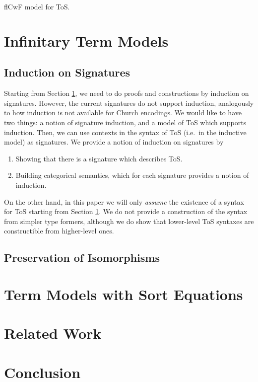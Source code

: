 \documentclass{llncs}
\newcommand{\ToS}{\mathsf{ToS}}
\newcommand{\flCwF}{\mathsf{flCwF}}
\begin{document}
\begin{nidefinition}{flCwF model for ToS.}
\begin{itemize}
\end{itemize}






\end{nidefinition}





\section{Infinitary Term Models}
\label{sec:infinitary_term_models}

\subsection{Induction on Signatures}


Starting from Section \ref{sec:infinitary_term_models}, we need to do proofs and
constructions by induction on signatures. However, the current signatures do not
support induction, analogously to how induction is not available for Church
encodings. We would like to have two things: a notion of signature induction,
and a model of ToS which supports induction. Then, we can use contexts in the
syntax of ToS (i.e.\ in the inductive model) as signatures. We provide a notion
of induction on signatures by
\begin{enumerate}
  \item Showing that there is a signature which describes ToS.
  \item Building categorical semantics, which for each signature provides a notion of induction.
\end{enumerate}
On the other hand, in this paper we will only \emph{assume} the existence of a
syntax for ToS starting from Section \ref{sec:infinitary_term_models}. We do not provide a
construction of the syntax from simpler type formers, although we do show that
lower-level ToS syntaxes are constructible from higher-level ones.

\subsection{Preservation of Isomorphisms}

\section{Term Models with Sort Equations}
\label{sec:sort_term}

\section{Related Work}
\label{sec:related}

\section{Conclusion}
\label{sec:conclusion}



\end{document}
